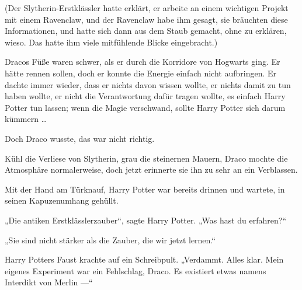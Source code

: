 (Der Slytherin-Erstklässler hatte erklärt, er arbeite an einem wichtigen Projekt mit einem Ravenclaw, und der Ravenclaw habe ihm gesagt, sie bräuchten diese Informationen, und hatte sich dann aus dem Staub gemacht, ohne zu erklären, wieso. Das hatte ihm viele mitfühlende Blicke eingebracht.)

Dracos Füße waren schwer, als er durch die Korridore von Hogwarts ging. Er hätte rennen sollen, doch er konnte die Energie einfach nicht aufbringen. Er dachte immer wieder, dass er nichts davon wissen wollte, er nichts damit zu tun haben wollte, er nicht die Verantwortung dafür tragen wollte, es einfach Harry Potter tun lassen; wenn die Magie verschwand, sollte Harry Potter sich darum kümmern …

Doch Draco wusste, das war nicht richtig.

Kühl die Verliese von Slytherin, grau die steinernen Mauern, Draco mochte die Atmosphäre normalerweise, doch jetzt erinnerte sie ihn zu sehr an ein Verblassen.

Mit der Hand am Türknauf, Harry Potter war bereits drinnen und wartete, in seinen Kapuzenumhang gehüllt.

„Die antiken Erstklässlerzauber“, sagte Harry Potter.
„Was hast du erfahren?“

„Sie sind nicht stärker als die Zauber, die wir jetzt lernen.“

Harry Potters Faust krachte auf ein Schreibpult.
„Verdammt. Alles klar. Mein eigenes Experiment war ein Fehlschlag, Draco. Es existiert etwas namens Interdikt von Merlin —“

